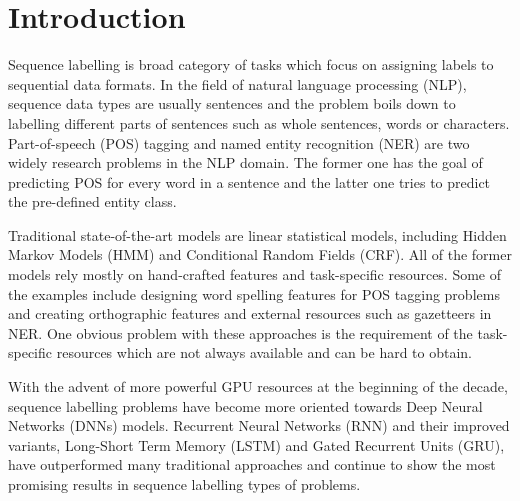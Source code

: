 \section{Introduction}
Sequence labelling is broad category of tasks which focus on assigning labels
to sequential data formats. In the field of natural language processing (NLP),
sequence data types are usually sentences and the problem boils down to
labelling different parts of sentences such as whole sentences, words or
characters.  Part-of-speech (POS) tagging and named entity recognition (NER)
are two widely research problems in the NLP domain. The former one has the goal
of predicting POS for every word in a sentence and the latter one tries to 
predict the pre-defined entity class.

Traditional state-of-the-art models are linear statistical models, including
Hidden Markov Models (HMM)\cite{hmm} and Conditional Random Fields
(CRF)\cite{crf}. All of the former models rely mostly on hand-crafted features
and task-specific resources. Some of the examples include designing word
spelling features for POS tagging problems and creating orthographic features
and external resources such as gazetteers in NER. One obvious problem with
these approaches is the requirement of the task-specific resources which are not
always available and can be hard to obtain.

With the advent of more powerful GPU resources at the beginning of the decade,
sequence labelling problems have become more oriented towards Deep Neural
Networks (DNNs) models. Recurrent Neural Networks (RNN)\cite{rnn} and their
improved variants, Long-Short Term Memory (LSTM)\cite{lstm} and Gated Recurrent
Units (GRU)\cite{gru}, have outperformed many traditional approaches and
continue to show the most promising results in sequence labelling types of
problems.

